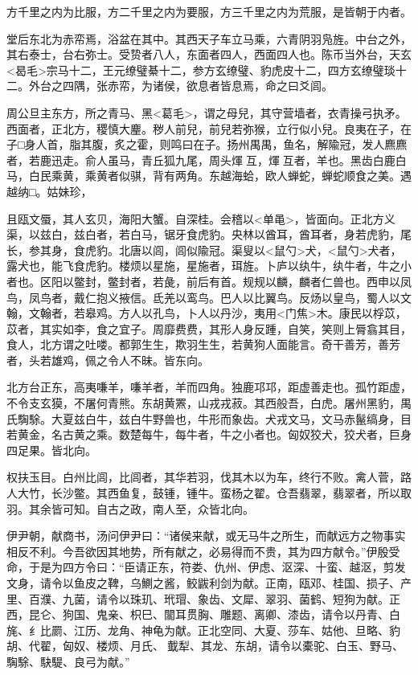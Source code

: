 \documentclass[]{article}
\begin{document}
方千里之内为比服，方二千里之内为要服，方三千里之内为荒服，是皆朝于内者。

堂后东北为赤帟焉，浴盆在其中。其西天子车立马乘，六青阴羽凫旌。中台之外，其右泰士，台右弥士。受贽者八人，东面者四人，西面四人也。陈币当外台，天玄\textless{}曷毛\textgreater{}宗马十二，王元缭璧綦十二，参方玄缭璧、豹虎皮十二，四方玄缭璧琰十二。外台之四隅，张赤帟，为诸侯，欲息者皆息焉，命之曰爻闾。

周公旦主东方，所之青马、黑\textless{}葛毛\textgreater{}，谓之母兒，其守营墙者，衣青操弓执矛。西面者，正北方，稷慎大麈。秽人前兒，前兒若弥猴，立行似小兒。良夷在子，在子□身人首，脂其腹，炙之霍，则鸣曰在子。扬州禺禺，鱼名，解隃冠，发人麃麃者，若鹿迅走。俞人虽马，青丘狐九尾，周头煇互，煇互者，羊也。黑齿白鹿白马，白民乘黄，乘黄者似骐，背有两角。东越海蛤，欧人蝉蛇，蝉蛇顺食之美。遇越纳□。姑妹珍，

且瓯文蜃，其人玄贝，海阳大蟹。自深桂。会稽以\textless{}单黾\textgreater{}，皆面向。正北方义渠，以兹白，兹白者，若白马，锯牙食虎豹。央林以酋耳，酋耳者，身若虎豹，尾长，参其身，食虎豹。北唐以闾，闾似隃冠。渠叟以\textless{}鼠勺\textgreater{}犬，\textless{}鼠勺\textgreater{}犬者，露犬也，能飞食虎豹。楼烦以星施，星施者，珥旌。卜庐以纨牛，纨牛者，牛之小者也。区阳以鳖封，鳖封者，若彘，前后有首。规规以麟，麟者仁兽也。西申以凤鸟，凤鸟者，戴仁抱义掖信。氐羌以鸾鸟。巴人以比翼鸟。反炀以皇鸟，蜀人以文翰，文翰者，若皋鸡。方人以孔鸟，卜人以丹沙，夷用\textless{}门焦\textgreater{}木。康民以桴苡，苡者，其实如李，食之宜子。周靡费费，其形人身反踵，自笑，笑则上脣翕其目，食人，北方谓之吐喽。都郭生生，欺羽生生，若黄狗人面能言。奇干善芳，善芳者，头若雄鸡，佩之令人不昧。皆东向。

北方台正东，高夷嗛羊，嗛羊者，羊而四角。独鹿邛邛，距虚善走也。孤竹距虚，不令支玄獏，不屠何青熊。东胡黄罴，山戎戎菽。其西般吾，白虎。屠州黑豹，禺氏騊駼。大夏兹白牛，兹白牛野兽也，牛形而象齿。犬戎文马，文马赤鬣缟身，目若黄金，名古黄之乘。数楚每牛，每牛者，牛之小者也。匈奴狡犬，狡犬者，巨身四足果。皆北向。

权扶玉目。白州比闾，比闾者，其华若羽，伐其木以为车，终行不败。禽人菅，路人大竹，长沙鳖。其西鱼复，鼓锺，锺牛。蛮杨之翟。仓吾翡翠，翡翠者，所以取羽。其余皆可知。自古之政，南人至，众皆北向。

伊尹朝，献商书，汤问伊尹曰：``诸侯来献，或无马牛之所生，而献远方之物事实相反不利。今吾欲因其地势，所有献之，必易得而不贵，其为四方献令。''伊殷受命，于是为四方令曰：``臣请正东，符娄、仇州、伊虑、沤深、十蛮、越沤，剪发文身，请令以鱼皮之鞞，乌鰂之酱，鲛鼥利剑为献。正南，瓯邓、桂国、损子、产里、百濮、九菌，请令以珠玑、玳瑁、象齿、文犀、翠羽、菌鹤、短狗为献。正西，昆仑、狗国、鬼亲、枳巳、闟耳贯胸、雕题、离卿、漆齿，请令以丹青、白旄、纟比罽、江历、龙角、神龟为献。正北空同、大夏、莎车、姑他、旦略、豹胡、代翟，匈奴、楼烦、月氏、韯犁、其龙、东胡，请令以橐驼、白玉、野马、騊駼、駃騠、良弓为献。''
\end{document}
